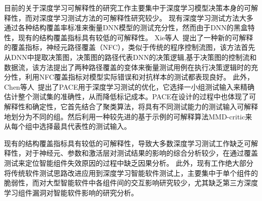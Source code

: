 目前的关于深度学习可解释性的研究工作主要集中于深度学习模型决策本身的可解释性，而对深度学习测试方法的可解释性研究较少。
现有深度学习测试方法大多通过各种结构覆盖率标准来衡量DNN模型的测试充分性，然而由于DNN的黑盒特性，现有的结构覆盖指标具有较低的可解释性。
Xie等人~提出了一种新的可解释的覆盖指标，神经元路径覆盖（NFC），类似于传统的程序控制流图，该方法首先从DNN中提取决策图，决策图的路径代表DNN的决策逻辑,基于决策图的控制流和数据流，该方法提出了两种路径覆盖的变体来衡量测试用例在执行决策逻辑时的充分性，利用NFC覆盖指标对模型实际错误和对抗样本的测试都表现良好。
此外，Chen等人~提出了PACE用于深度学习测试的优化，它选择一小组测试输入来精确估计整个测试集的准确性，从而降低标记成本。PACE在设计的过程中也体现了可解释性和确定性，它首先结合了聚类算法，将具有不同测试能力的测试输入可解释地划分为不同的组。然后利用一种较先进的基于示例的可解释算法MMD-critic来从每个组中选择最具代表性的测试输入。

现有的结构覆盖指标具有较低的可解释性，导致大多数深度学习测试工作缺乏可解释性，对于神经元、参数和激活层对测试结果的影响的综合分析较少，在通过覆盖测试来定位智能组件失效原因的过程中缺乏因果分析。
此外，现有工作绝大部分将传统软件测试思路改进应用到深度学习智能软件测试上，主要集中于单个组件的脆弱性，而对大型智能软件中各组件间的交互影响研究较少，尤其缺乏第三方深度学习组件漏洞对智能软件影响的研究分析。



























\begin{spacing}{1.3} %
	 \songti
	
	
	\vspace{11bp}
\end{spacing}
